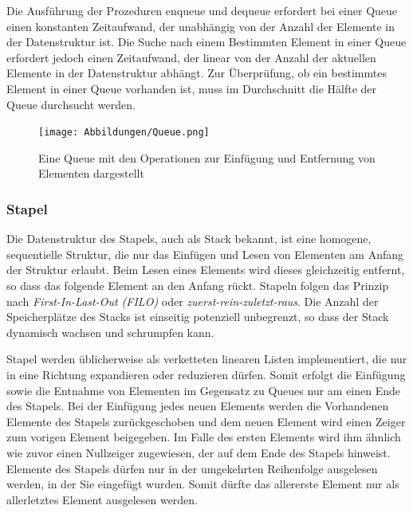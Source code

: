 Die Ausführung der Prozeduren enqueue und dequeue erfordert bei einer Queue einen konstanten Zeitaufwand, der unabhängig von der Anzahl der Elemente in der Datenstruktur ist. Die Suche nach einem Bestimmten Element in einer Queue erfordert jedoch einen Zeitaufwand, der linear von der Anzahl der aktuellen Elemente in der Datenstruktur abhängt. Zur Überprüfung, ob ein bestimmtes Element in einer Queue vorhanden ist, muss im Durchschnitt die Hälfte der Queue durchsucht werden. \autocite[318]{hoffmann_einfuhrung_2011}

\begin{figure}[t]
	\texttt{[image: Abbildungen/Queue.png]}
	\centering
	\caption{Eine Queue mit den Operationen zur Einfügung und Entfernung von Elementen dargestellt \autocite[371]{gumm_band_2016}}
	\label{fig: queue}
\end{figure}

\subsubsection{Stapel}
Die Datenstruktur des Stapels, auch als Stack bekannt, ist eine homogene, sequentielle Struktur, die nur das Einfügen und Lesen von Elementen am Anfang der Struktur erlaubt. Beim Lesen eines Elements wird dieses gleichzeitig entfernt, so dass das folgende Element an den Anfang rückt. Stapeln folgen das Prinzip nach \textit{First-In-Last-Out (FILO)} oder \textit{zuerst-rein-zuletzt-raus}. Die Anzahl der Speicherplätze des Stacks ist einseitig potenziell unbegrenzt, so dass der Stack dynamisch wachsen und schrumpfen kann. \autocite[614]{ernst_grundkurs_2020}

Stapel werden üblicherweise als verketteten linearen Listen implementiert, die nur in eine Richtung expandieren oder reduzieren dürfen. Somit erfolgt die Einfügung sowie die Entnahme von Elementen im Gegensatz zu Queues nur am einen Ende des Stapels. Bei der Einfügung jedes neuen Elements werden die Vorhandenen Elemente des Stapels zurückgeschoben und dem neuen Element wird einen Zeiger zum vorigen Element beigegeben. Im Falle des ersten Elements wird ihm ähnlich wie zuvor einen Nullzeiger zugewiesen, der auf dem Ende des Stapels hinweist. Elemente des Stapels dürfen nur in der umgekehrten Reihenfolge ausgelesen werden, in der Sie eingefügt wurden. Somit dürfte das allererste Element nur als allerletztes Element ausgelesen werden. \autocite[363]{gumm_band_2016}

